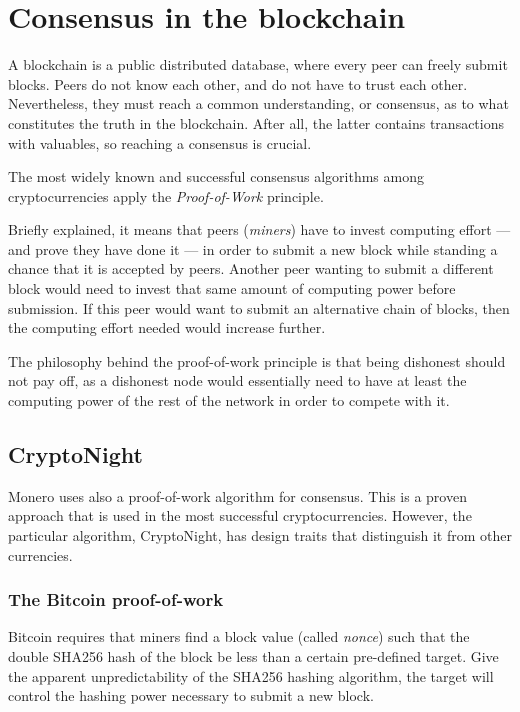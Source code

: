 

\chapter{Consensus in the blockchain}
\label{chapter:consensus}

A blockchain is a public distributed database, where every peer can freely submit blocks.
Peers do not know each other, and do not have to trust each other.
Nevertheless, they must reach a common understanding, or consensus, as to what constitutes
the truth in the blockchain.
After all, the latter contains transactions with valuables, so reaching a consensus is crucial.

The most widely known and successful consensus algorithms among cryptocurrencies apply
the {\em Proof-of-Work} principle.

Briefly explained, it means that peers ({\em miners}) have to invest computing effort
--- and prove they have done it ---
in order to submit a new block while standing a chance that it is accepted by peers.
Another peer wanting to submit a different block would need to invest that same amount of
computing power before submission.
If this peer would want to submit an alternative chain of blocks, then the computing 
effort needed would increase further.

The philosophy behind the proof-of-work principle is that being dishonest should not pay off,
as a dishonest node would essentially need to have at least the computing power of the rest of the network
in order to compete with it.


\section{CryptoNight}

Monero uses also a proof-of-work algorithm for consensus. This is a proven approach that
is used in the most successful cryptocurrencies.
However, the particular algorithm, CryptoNight, has design traits that distinguish it from 
other currencies.


\subsection{The Bitcoin proof-of-work}

Bitcoin requires that miners find a block value (called {\em nonce}) such that the double SHA256
hash of the block be less than a certain pre-defined target. Give the apparent unpredictability
of the SHA256 hashing algorithm, the target will control the hashing power necessary
to submit a new block.

